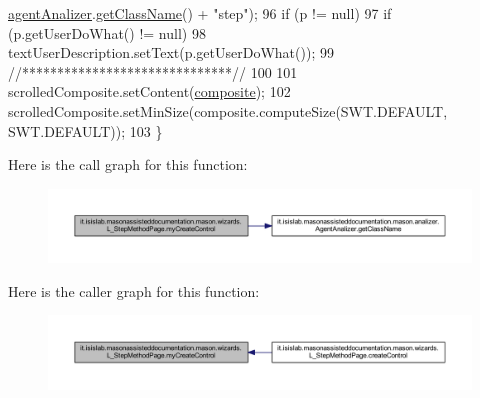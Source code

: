 \begin{DoxyCode}
      \hyperlink{classit_1_1isislab_1_1masonassisteddocumentation_1_1mason_1_1wizards_1_1_l___step_method_page_ad5fe05afd95ed6f23ede53109ae21735}{agentAnalizer}.\hyperlink{classit_1_1isislab_1_1masonassisteddocumentation_1_1mason_1_1analizer_1_1_agent_analizer_a94492199c5e4873a07a2a46d15617937}{getClassName}() + \textcolor{stringliteral}{"step"});
96         \textcolor{keywordflow}{if} (p != null)
97             \textcolor{keywordflow}{if} (p.getUserDoWhat() != null)
98                 textUserDescription.setText(p.getUserDoWhat());
99         \textcolor{comment}{//******************************//}
100         
101         scrolledComposite.setContent(\hyperlink{classit_1_1isislab_1_1masonassisteddocumentation_1_1mason_1_1wizards_1_1_l___step_method_page_ad8812271bc4da1c3b7d4e415d45e875d}{composite});
102         scrolledComposite.setMinSize(composite.computeSize(SWT.DEFAULT, SWT.DEFAULT));
103     \}
\end{DoxyCode}


Here is the call graph for this function\-:\nopagebreak
\begin{figure}[H]
\begin{center}
\leavevmode
\includegraphics[width=350pt]{classit_1_1isislab_1_1masonassisteddocumentation_1_1mason_1_1wizards_1_1_l___step_method_page_a5b1bfbacb4409e90ff72c3739e989672_cgraph}
\end{center}
\end{figure}




Here is the caller graph for this function\-:\nopagebreak
\begin{figure}[H]
\begin{center}
\leavevmode
\includegraphics[width=350pt]{classit_1_1isislab_1_1masonassisteddocumentation_1_1mason_1_1wizards_1_1_l___step_method_page_a5b1bfbacb4409e90ff72c3739e989672_icgraph}
\end{center}
\end{figure}





